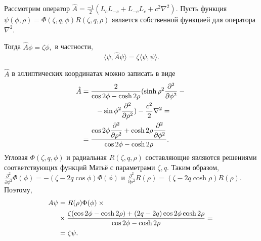 Рассмотрим оператор  $\hat A = \frac{-1}{2}(L_c L_{-c} + L_{-c} L_c + c^2 \nabla ^2)$. Пусть функция $\psi(\phi, \rho) = \Phi(\zeta, q, \phi) R(\zeta, q, \rho)$ является собственной функцией для оператора $\nabla^2$. %

Тогда
$\hat A \phi = \zeta \phi,$
в частности,
\begin{equation}
\langle  \psi, \hat A \psi\rangle = \zeta \langle\psi, \psi\rangle. \label{eq:cons}
\end{equation}


$\hat A$ в эллиптических координатах можно записать в виде 
\begin{align*}
\hat A & = \frac{2}{\cos 2\phi - \cosh 2\rho}(\sinh{\rho}^2 \dfrac{\partial^2}{\partial \phi^2}-{}\notag\\ 
&\qquad{}-\sin\phi^2\dfrac{\partial^2}{\partial \rho^2})  -\frac{c^2}{2} \nabla^2 =\notag\\
&= \frac{\cos 2\phi \dfrac{\partial^2}{\partial \rho^2} + \cosh 2\rho \dfrac{\partial^2}{\partial \phi^2}}{\cos 2 \phi - \cosh 2 \rho}.
\end{align*}
Угловая  $\Phi(\zeta, q, \phi)$ и радиальная   $R(\zeta, q, \rho)$ составляющие являются решениями соответствующих функций Матьё с параметрами  $\zeta, q$.
Таким образом,
$\frac{\partial^2}{\partial \phi ^2} \Phi(\phi) = -(\zeta-2q\cos\phi)\Phi(\phi)$ и $\frac{\partial^2}{\partial \rho ^2} R(\rho) = (\zeta-2q\cosh\rho)R(\rho)$. 
Поэтому,
\begin{align*}
A \psi &= R(\rho)\Phi(\phi)\times {}\notag\\
&{}\times\frac{\zeta(\cos 2\phi -\cosh2\rho) + (2q-2q)\cos2\phi\cosh2\rho}{\cos 2 \phi - \cosh 2 \rho} = {}\notag \\
&{}=\zeta \psi.
\end{align*}



\FloatBarrier

